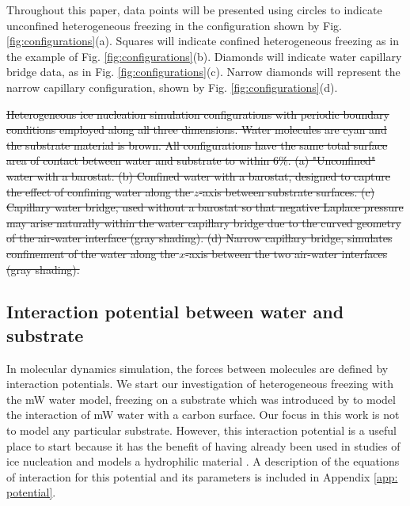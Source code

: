 \documentclass[journal abbreviation, manuscript]{copernicus}
\providecommand{\DIFdel}[1]{{\protect\color{red}\sout{#1}}}                      %
\providecommand{\DIFdelbegin}{} %
\providecommand{\DIFdelend}{} %
\providecommand{\DIFdelFL}[1]{\DIFdel{#1}} %
\begin{document}
Throughout this paper, data points will be presented using circles to indicate unconfined heterogeneous freezing in the configuration shown by Fig. \ref{fig:configurations}(a). Squares will indicate confined heterogeneous freezing as in the example of Fig. \ref{fig:configurations}(b). Diamonds will indicate water capillary bridge data, as in Fig. \ref{fig:configurations}(c). Narrow diamonds will represent the narrow capillary configuration, shown by Fig. \ref{fig:configurations}(d).



\DIFdelbegin %

{%
\DIFdelFL{Heterogeneous ice nucleation simulation configurations with periodic boundary conditions employed along all three dimensions. Water molecules are cyan and the substrate material is brown. All configurations have the same total surface area of contact between water and substrate to within 6\%. (a) "Unconfined" water with a barostat. (b) Confined water with a barostat, designed to capture the effect of confining water along the $z$-axis between substrate surfaces. (c) Capillary water bridge, used without a barostat so that negative Laplace pressure may arise naturally within the water capillary bridge due to the curved geometry of the air-water interface (gray shading). (d) Narrow capillary bridge, simulates confinement of the water along the $x$-axis between the two air-water interfaces (gray shading).}}

\DIFdelend \subsection{Interaction potential between water and substrate}

In molecular dynamics simulation, the forces between molecules are defined by interaction potentials. We start our investigation of heterogeneous freezing with the mW water model, freezing on a substrate which was introduced by \citet{lupi2014} to model the interaction of mW water with a carbon surface. Our focus in this work is not to model any particular substrate. However, this interaction potential is a useful place to start because it has the benefit of having already been used in studies of ice nucleation and models a hydrophilic material \citep{lupi2014, Bi2016}. A description of the equations of interaction for this potential and its parameters is included in Appendix \ref{app: potential}.
\end{document}
